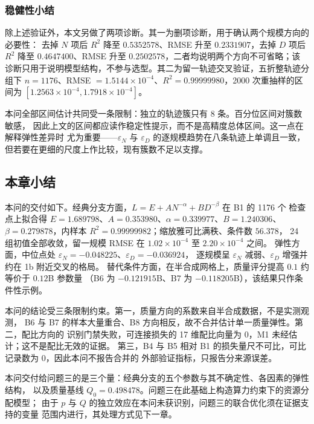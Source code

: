 \documentclass[bwprint]{gmcmthesis}
\numberwithin{equation}{section}
\numberwithin{figure}{section}
\numberwithin{table}{section}
\begin{document}
\subsubsection{稳健性小结}

除上述验证外，本文另做了两项诊断。其一为删项诊断，用于确认两个规模方向的必要性：
去掉 $N$ 项后 $R^2$ 降至 $0.5352578$、RMSE 升至 $0.2331907$，去掉 $D$ 项后
$R^2$ 降至 $0.4647400$、RMSE 升至 $0.2502578$，二者均说明两个方向不可省略；该
诊断只用于说明模型结构，不参与选型。其二为留一轨迹交叉验证，五折整轨迹分组下
$n=1176$、RMSE $=1.5144\times10^{-4}$、$R^2=0.99999980$，2000 次重抽样的区间为
$[1.2563\times10^{-4},1.7918\times10^{-4}]$。

本问全部区间估计共同受一条限制：独立的轨迹簇只有 8 条。百分位区间对簇数敏感，
因此上文的区间都应读作稳定性提示，而不是高精度总体区间。这一点在解释弹性差异时
尤为重要——$\varepsilon_N$ 与 $\varepsilon_D$ 的逐规模趋势在八条轨迹上单调且一致，
但若要在更细的尺度上作比较，现有簇数不足以支撑。

\subsection{本章小结}

本问的交付如下。经典分支方面，$L=E+AN^{-\alpha}+BD^{-\beta}$ 在 B1 的 1176 个
检查点上拟合得 $E=1.689798$、$A=0.353980$、$\alpha=0.339977$、$B=1.240306$、
$\beta=0.279878$，内样本 $R^2=0.99999982$；缩放雅可比满秩、条件数 $56.378$，
24 组初值全部收敛，留一规模 RMSE 在 $1.02\times10^{-4}$ 至 $2.20\times10^{-4}$ 之间。
弹性方面，中位点处 $\varepsilon_N=-0.048225$、$\varepsilon_D=-0.036924$，
逐规模呈 $\varepsilon_N$ 减弱、$\varepsilon_D$ 增强并约在 1b 附近交叉的格局。
替代条件方面，在半合成网格上，质量评分提高 $0.1$ 约等价于 $0.12$B 参数量
（B6 为 $-0.121915$B、B7 为 $-0.118205$B），该结果只作条件性示例。

本问的结论受三条限制约束。第一，质量方向的系数来自半合成数据，不是实测观测，
B6 与 B7 的样本大量重合、B8 方向相反，故不合并估计单一质量弹性。第二，配比方向的
识别门禁失败，可连接损失的 17 维配比向量为 0，M1 未经估计；这不是配比无效的证据。
第三，B4 与 B5 相对 B1 的损失量尺不可比，可比记录数为 0，因此本问不报告合并的
外部验证指标，只报告分来源误差。

本问交付给问题三的是三个量：经典分支的五个参数与其不确定性、各因素的弹性结构，
以及质量基线 $Q_0=0.498478$。问题三在此基础上构造算力约束下的资源分配模型；
由于 $p$ 与 $Q$ 的独立效应在本问未获识别，问题三的联合优化须在证据支持的变量
范围内进行，其处理方式见下一章。
\end{document}
